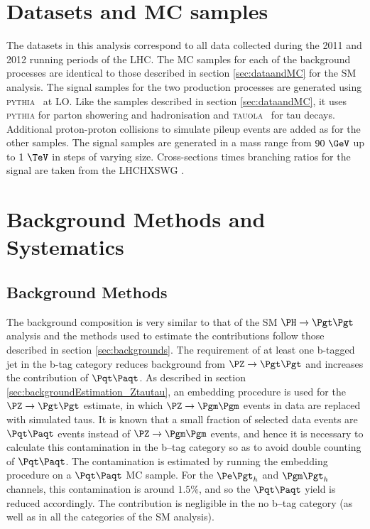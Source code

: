 \section{Datasets and \ac{MC} samples}
\label{sec:mssmdataandMC}

The datasets in this analysis correspond to all data collected during the 2011
and 2012 running periods of the \ac{LHC}.
The \ac{MC} samples for each of the background processes are
identical to those described in section \ref{sec:dataandMC} for the \ac{SM}
analysis. The signal samples for the two production processes are
generated using \textsc{pythia}~\cite{Sjostrand:2006za} at \ac{LO}. Like the
samples described in section \ref{sec:dataandMC}, it uses \textsc{pythia}
for parton showering and hadronisation and \textsc{tauola}~\cite{TAUOLA} for tau
decays. Additional proton-proton collisions to simulate pileup events are added
as for the other samples. The signal samples are generated in a mass range from
$90~\GeV$ up to $1~\TeV$ in steps of varying size. Cross-sections times
branching ratios for the signal are taken from the \ac{LHCHXSWG}
\cite{LHCHiggsCrossSectionWorkingGroup:2011ti,Dittmaier:2012vm,Heinemeyer:2013tqa}.

\section{Background Methods and Systematics}
\label{sec:mssmBackgroundsSysts}

\subsection{Background Methods}
\label{sec:mssmBackgrounds}
The background composition is very similar to that of the \ac{SM} $\HToTauTau$
analysis and the methods used to estimate the contributions follow those
described in section \ref{sec:backgrounds}. The requirement of at least one
b-tagged jet in the b-tag category reduces background from $\ZToTauTau$
and increases the contribution of $\ttbar$. As described in section
\ref{sec:backgroundEstimation_Ztautau}, an embedding procedure is used for the
$\ZToTauTau$ estimate, in which $\PZ\to\Pgm\Pgm$ events in data are replaced
with simulated taus. It is known that a small fraction of selected data events
are $\ttbar$ events instead of $\PZ\to\Pgm\Pgm$ events, and hence it is
necessary to calculate this contamination in the b--tag category so as to avoid
double counting of $\ttbar$. The contamination is estimated by running the
embedding procedure on a $\ttbar$ \ac{MC} sample. For the $\etau$ and $\mutau$ channels, this
contamination is around $1.5\%$, and so the $\ttbar$ yield is reduced
accordingly. The contribution is negligible in the no b--tag category (as well
as in all the categories of the \ac{SM} analysis). 

